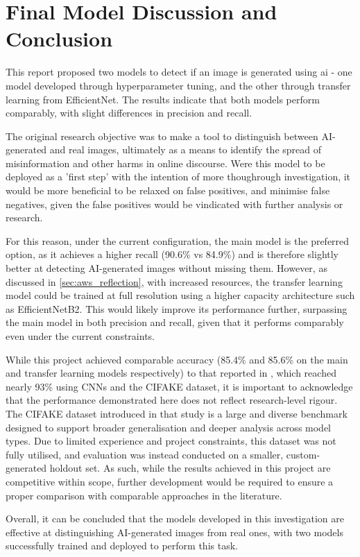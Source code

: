 \section{Final Model Discussion and Conclusion}

This report proposed two models to detect if an image is generated using ai - one model developed through hyperparameter tuning, and the other through transfer learning from EfficientNet. The results indicate that both models perform comparably, with slight differences in precision and recall.

The original research objective was to make a tool to distinguish between AI-generated and real images, ultimately as a means to identify the spread of misinformation and other harms in online discourse. Were this model to be deployed as a 'first step' with the intention of more thoughrough investigation, it would be more beneficial to be relaxed on false positives, and minimise false negatives, given the false positives would be vindicated with further analysis or research.

For this reason, under the current configuration, the main model is the preferred option, as it achieves a higher recall (90.6\% vs 84.9\%) and is therefore slightly better at detecting AI-generated images without missing them. However, as discussed in \cref{sec:aws_reflection}, with increased resources, the transfer learning model could be trained at full resolution using a higher capacity architecture such as EfficientNetB2. This would likely improve its performance further, surpassing the main model in both precision and recall, given that it performs comparably even under the current constraints.

While this project achieved comparable accuracy (85.4\% and 85.6\% on the main and transfer learning models respectively) to that reported in \cite{bird2023cifakeimageclassificationexplainable}, which reached nearly 93\% using CNNs and the CIFAKE dataset, it is important to acknowledge that the performance demonstrated here does not reflect research-level rigour. The CIFAKE dataset introduced in that study is a large and diverse benchmark designed to support broader generalisation and deeper analysis across model types. Due to limited experience and project constraints, this dataset was not fully utilised, and evaluation was instead conducted on a smaller, custom-generated holdout set. As such, while the results achieved in this project are competitive within scope, further development would be required to ensure a proper comparison with comparable approaches in the literature.

Overall, it can be concluded that the models developed in this investigation are effective at distinguishing AI-generated images from real ones, with two models successfully trained and deployed to perform this task.
